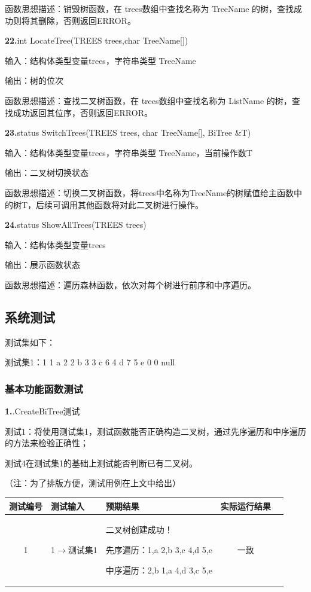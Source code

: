 \documentclass[supercite]{Experimental_Report}
\theoremstyle{definition}
\begin{document}
函数思想描述：销毁树函数，在 trees数组中查找名称为 TreeName 的树，查找成功则将其删除，否则返回ERROR。

\noindent\textbf{22.}int LocateTree(TREES trees,char TreeName[])

输入：结构体类型变量trees，字符串类型 TreeName

输出：树的位次

函数思想描述：查找二叉树函数，在 trees数组中查找名称为 ListName 的树，查找成功返回其位序，否则返回ERROR。

\noindent\textbf{23.}status SwitchTrees(TREES trees, char TreeName[], BiTree \&T)

输入：结构体类型变量trees，字符串类型 TreeName，当前操作数T

输出：二叉树切换状态

函数思想描述：切换二叉树函数，将trees中名称为TreeName的树赋值给主函数中的树T，后续可调用其他函数将对此二叉树进行操作。

\noindent\textbf{24.}status ShowAllTrees(TREES trees)

输入：结构体类型变量trees

输出：展示函数状态

函数思想描述：遍历森林函数，依次对每个树进行前序和中序遍历。

\subsection{系统测试}

测试集如下：

测试集1：1 1 a  2 2 b  3 3 c  6 4 d  7 5 e  0 0 null

\setcounter{paragraph}{0}

\subsubsection{基本功能函数测试}

\noindent\textbf{ 1.}.CreateBiTree测试

测试1：将使用测试集1，测试函数能否正确构造二叉树，通过先序遍历和中序遍历的方法来检验正确性；

测试4在测试集1的基础上测试能否判断已有二叉树。

（注：为了排版方便，测试用例在上文中给出）

\vspace{0.5em}

\begin{tabular}{|c|l|p{6cm}|c|c|}
	\hline
	测试编号 & 测试输入 & 预期结果 & 实际运行结果 \\
	\hline
	1 & 1$\rightarrow$测试集1 & 二叉树创建成功！

先序遍历：1,a 2,b 3,c 4,d 5,e

中序遍历：2,b 1,a 4,d 3,c 5,e & 一致 \\
	\hline
\end{tabular}
\end{document}
